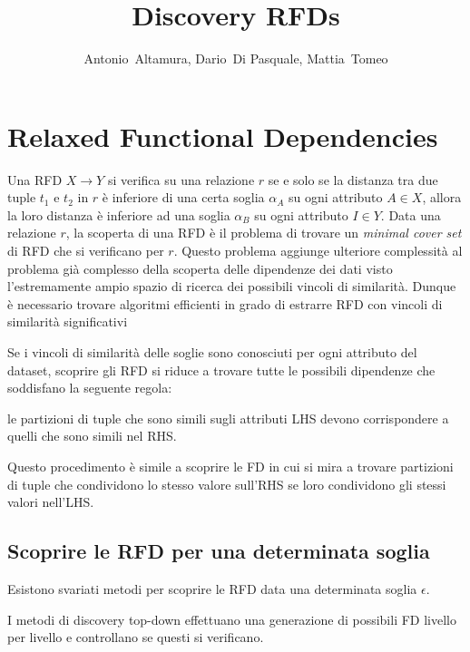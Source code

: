 \documentclass[11pt]{article}
\begin{document}
\title{Discovery RFDs}

\author{Antonio~Altamura,
		Dario~Di Pasquale,
   	Mattia~Tomeo}%
   	
 
\maketitle
\section{Relaxed Functional Dependencies}
Una RFD $X \rightarrow Y$ si verifica su una relazione $r$ se e solo se la distanza tra due tuple $t_1$ e $t_2$ in $r$ è inferiore di una certa soglia $\alpha_A$ su ogni attributo $A \in X$, allora la loro distanza è inferiore ad una soglia $\alpha_B$ su ogni attributo $I \in Y$. 
Data una relazione $r$, la scoperta di una RFD è il problema di trovare un \textit{minimal cover set} di RFD che si verificano per $r$. Questo problema aggiunge ulteriore complessità al problema già complesso della scoperta delle dipendenze dei dati visto l'estremamente ampio spazio di ricerca dei possibili vincoli di similarità. Dunque è necessario trovare algoritmi efficienti in grado di estrarre RFD con vincoli di similarità significativi

Se i vincoli di similarità delle soglie sono conosciuti per ogni attributo del dataset, scoprire gli RFD si riduce a trovare tutte le possibili dipendenze che soddisfano la seguente regola:
\begin{center}
le partizioni di tuple che sono simili sugli attributi LHS devono corrispondere a quelli che sono simili nel RHS.
\end{center}
Questo procedimento è simile a scoprire le FD in cui si mira a trovare partizioni di tuple che condividono lo stesso valore sull'RHS se loro condividono gli stessi valori nell'LHS. 

\subsection{Scoprire le RFD per una determinata soglia}
Esistono svariati metodi per scoprire le RFD data una determinata soglia $\epsilon$.

I metodi di discovery top-down effettuano una generazione di possibili FD livello per livello e controllano se questi si verificano.




\end{document}
